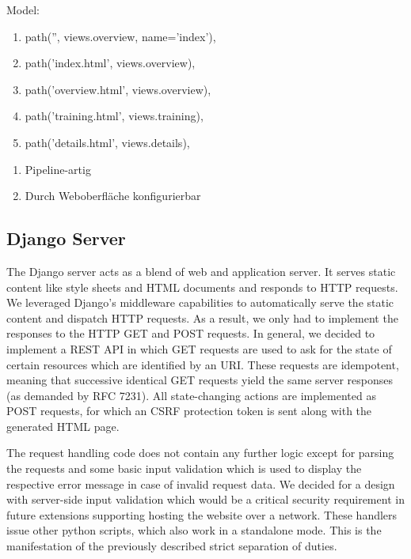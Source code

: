 Model:
\begin{enumerate}
\item path('', views.overview, name='index'),
\item path('index.html', views.overview),
\item path('overview.html', views.overview),
\item path('training.html', views.training),
\item path('details.html', views.details),



\end{enumerate}

\begin{enumerate}
\item Pipeline-artig
\item Durch Weboberfläche konfigurierbar
\end{enumerate}

\subsection{Django Server}\label{subsec:webserver}
The Django server acts as a blend of web and application server.
It serves static content like style sheets and HTML documents and responds to HTTP requests.
We leveraged Django's middleware capabilities to automatically serve the static content and dispatch HTTP requests.
As a result, we only had to implement the responses to the HTTP GET and POST requests.
In general, we decided to implement a REST API in which GET requests are used to ask for the state of certain resources which are identified by an URI.
These requests are idempotent, meaning that successive identical GET requests yield the same server responses (as demanded by RFC 7231\cite{rfc7231}).
All state-changing actions are implemented as POST requests, for which an CSRF protection token is sent along with the generated HTML page.

The request handling code does not contain any further logic except for parsing the requests and some basic input validation which is used to display the respective error message in case of invalid request data.
We decided for a design with server-side input validation which would be a critical security requirement in future extensions supporting hosting the website over a network.
These handlers issue other python scripts, which also work in a standalone mode.
This is the manifestation of the previously described strict separation of duties.

